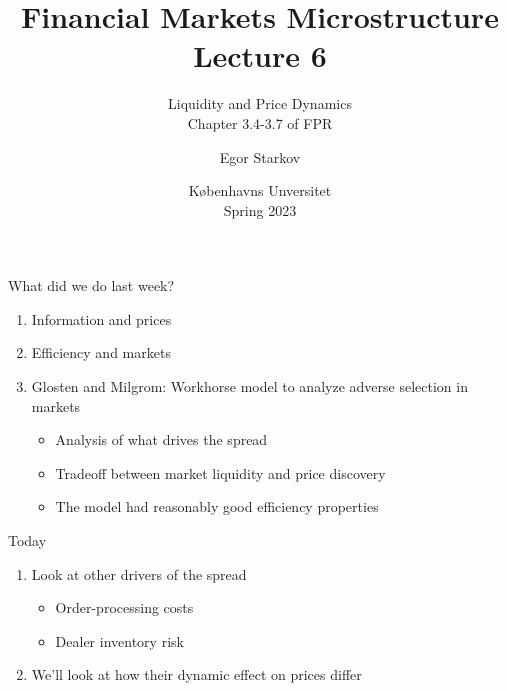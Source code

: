 \documentclass[english,10pt
,aspectratio=169
]{beamer}
\title{Financial Markets Microstructure \\ Lecture 6}
\subtitle{Liquidity and Price Dynamics\\
Chapter 3.4-3.7 of FPR}
\author{Egor Starkov}
\date{K{\o}benhavns Unversitet \\
	Spring 2023}
\begin{document}
	

\frame[plain]{\titlepage}



\begin{frame}{What did we do last week?}
\begin{enumerate}
	\item Information and prices
	\item Efficiency and markets
	\item Glosten and Milgrom: Workhorse model to analyze adverse selection in markets
	\begin{itemize}
	\item Analysis of what drives the spread
	\item Tradeoff between market liquidity and price discovery
	\item The model had reasonably good efficiency properties
	\end{itemize}
\end{enumerate}
\end{frame}




\begin{frame}{Today}
\begin{enumerate}
	\item Look at other drivers of the spread
	\begin{itemize}
		\item Order-processing costs
		\item Dealer inventory risk
	\end{itemize}
	\item We'll look at how their dynamic effect on prices differ
\end{enumerate}
\end{frame}
\end{document}
